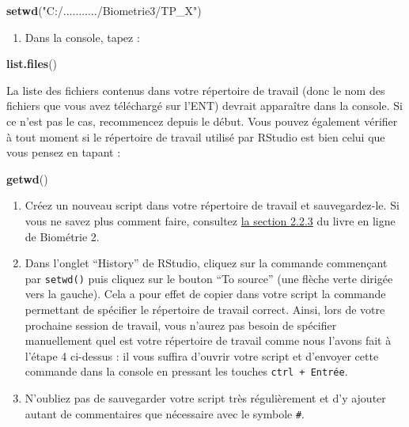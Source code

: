\documentclass[a4paperpaper,]{article}
\newenvironment{Shaded}{\begin{snugshade}}{\end{snugshade}}
\newcommand{\KeywordTok}[1]{\textcolor[rgb]{0.12,0.11,0.11}{\textbf{#1}}}
\newcommand{\NormalTok}[1]{\textcolor[rgb]{0.12,0.11,0.11}{#1}}
\newcommand{\StringTok}[1]{\textcolor[rgb]{0.75,0.01,0.01}{#1}}
\providecommand{\tightlist}{%
  \setlength{\itemsep}{0pt}\setlength{\parskip}{0pt}}
\begin{document}
\begin{Shaded}
\begin{Highlighting}[]
\KeywordTok{setwd}\NormalTok{(}\StringTok{"C:/.........../Biometrie3/TP_X"}\NormalTok{)}
\end{Highlighting}
\end{Shaded}

\begin{enumerate}
\def\labelenumi{\arabic{enumi}.}
\setcounter{enumi}{4}
\tightlist
\item
  Dans la console, tapez :
\end{enumerate}

\begin{Shaded}
\begin{Highlighting}[]
\KeywordTok{list.files}\NormalTok{()}
\end{Highlighting}
\end{Shaded}

La liste des fichiers contenus dans votre répertoire de travail (donc le nom des fichiers que vous avez téléchargé sur l'ENT) devrait apparaître dans la console. Si ce n'est pas le cas, recommencez depuis le début. Vous pouvez également vérifier à tout moment si le répertoire de travail utilisé par RStudio est bien celui que vous pensez en tapant :

\begin{Shaded}
\begin{Highlighting}[]
\KeywordTok{getwd}\NormalTok{()}
\end{Highlighting}
\end{Shaded}

\begin{enumerate}
\def\labelenumi{\arabic{enumi}.}
\setcounter{enumi}{5}
\tightlist
\item
  Créez un nouveau script dans votre répertoire de travail et sauvegardez-le. Si vous ne savez plus comment faire, consultez \href{https://besibo.github.io/Biometrie2/bases.html\#les-scripts}{la section 2.2.3} du livre en ligne de Biométrie 2.
\item
  Dans l'onglet ``History'' de RStudio, cliquez sur la commande commençant par \texttt{setwd()} puis cliquez sur le bouton ``To source'' (une flèche verte dirigée vers la gauche). Cela a pour effet de copier dans votre script la commande permettant de spécifier le répertoire de travail correct. Ainsi, lors de votre prochaine session de travail, vous n'aurez pas besoin de spécifier manuellement quel est votre répertoire de travail comme nous l'avons fait à l'étape 4 ci-dessus : il vous suffira d'ouvrir votre script et d'envoyer cette commande dans la console en pressant les touches \texttt{ctrl\ +\ Entrée}.
\item
  N'oubliez pas de sauvegarder votre script très régulièrement et d'y ajouter autant de commentaires que nécessaire avec le symbole \texttt{\#}.
\end{enumerate}
\end{document}

